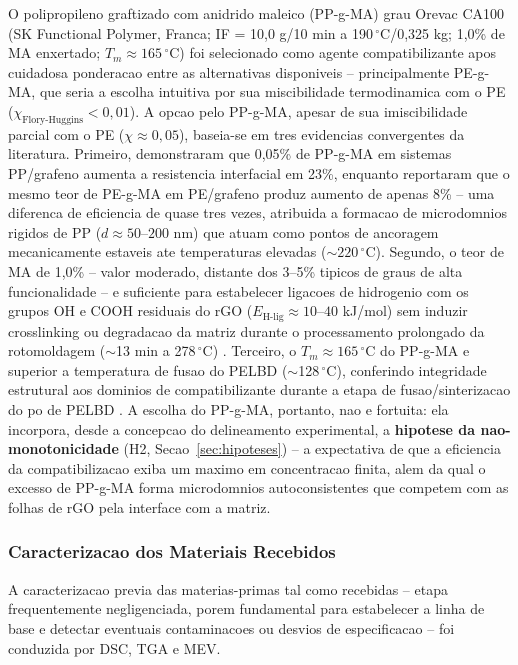 \documentclass[11pt,a4paper,oneside]{article}
\begin{document}
O polipropileno graftizado com anidrido maleico (PP-g-MA) grau Orevac CA100 (SK Functional
Polymer, Franca; IF = 10,0 g/10 min a 190$\,^{\circ}$C/0,325 kg; 1,0\% de MA enxertado;
$T_m \approx 165\,^{\circ}$C) foi selecionado como agente compatibilizante apos cuidadosa
ponderacao entre as alternativas disponiveis -- principalmente PE-g-MA, que seria a escolha
intuitiva por sua miscibilidade termodinamica com o PE ($\chi_{\text{Flory-Huggins}}{<}0{,}01$).
A opcao pelo PP-g-MA, apesar de sua imiscibilidade parcial com o PE ($\chi{\approx}0{,}05$),
baseia-se em tres evidencias convergentes da literatura. Primeiro, \citet{Natarajan2020}
demonstraram que 0,05\% de PP-g-MA em sistemas PP/grafeno aumenta a resistencia interfacial em
23\%, enquanto \citet{Sanchez2018} reportaram que o mesmo teor de PE-g-MA em PE/grafeno produz
aumento de apenas 8\% -- uma diferenca de eficiencia de quase tres vezes, atribuida a formacao
de microdomnios rigidos de PP ($d{\approx}50$--$200$ nm) que atuam como pontos de ancoragem
mecanicamente estaveis ate temperaturas elevadas (${\sim}220\,^{\circ}$C). Segundo, o teor de MA
de 1,0\% -- valor moderado, distante dos 3--5\% tipicos de graus de alta funcionalidade -- e
suficiente para estabelecer ligacoes de hidrogenio com os grupos OH e COOH residuais do rGO
($E_{\text{H-lig}}{\approx}10$--$40$ kJ/mol) sem induzir crosslinking ou degradacao da matriz
durante o processamento prolongado da rotomoldagem (${\sim}$13 min a 278$\,^{\circ}$C)
\cite{Sanes2020, Rasselet2019}. Terceiro, o $T_m{\approx}165\,^{\circ}$C do PP-g-MA e superior
a temperatura de fusao do PELBD (${\sim}$128$\,^{\circ}$C), conferindo integridade estrutural
aos dominios de compatibilizante durante a etapa de fusao/sinterizacao do po de PELBD
\cite{Lopez2021}. A escolha do PP-g-MA, portanto, nao e fortuita: ela incorpora, desde a
concepcao do delineamento experimental, a {\bfseries hipotese da nao-monotonicidade} (H2,
Secao~\ref{sec:hipoteses}) -- a expectativa de que a eficiencia da compatibilizacao exiba um
maximo em concentracao finita, alem da qual o excesso de PP-g-MA forma microdomnios
autoconsistentes que competem com as folhas de rGO pela interface com a matriz.

\subsubsection{Caracterizacao dos Materiais Recebidos}

A caracterizacao previa das materias-primas tal como recebidas -- etapa frequentemente
negligenciada, porem fundamental para estabelecer a linha de base e detectar eventuais
contaminacoes ou desvios de especificacao -- foi conduzida por DSC, TGA e MEV.
\end{document}
